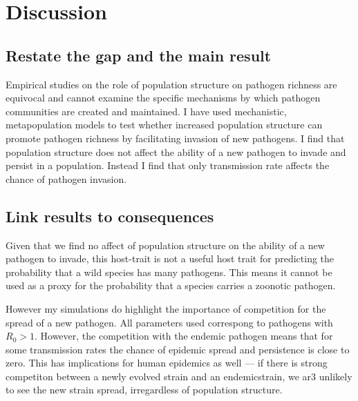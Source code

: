 

\section{Discussion}


\subsection{Restate the gap and the main result}

Empirical studies on the role of population structure on pathogen richness are equivocal and cannot examine the specific mechanisms by which pathogen communities are created and maintained.
I have used mechanistic, metapopulation models to test whether increased population structure can promote pathogen richness by facilitating invasion of new pathogens.
I find that population structure does not affect the ability of a new pathogen to invade and persist in a population.
Instead I find that only transmission rate affects the chance of pathogen invasion.


\subsection{Link results to consequences}

Given that we find no affect of population structure on the ability of a new pathogen to invade, this host-trait is not a useful host trait for predicting the probability that a wild species has many pathogens.
This means it cannot be used as a proxy for the probability that a species carries a zoonotic pathogen.

However my simulations do highlight the importance of competition for the spread of a new pathogen.
All parameters used correspong to pathogens with $R_0>1$.
However, the competition with the endemic pathogen means that for some transmission rates the chance of epidemic spread and persistence is close to zero.
This has implications for human epidemics as well --- if there is strong competiton between a newly evolved strain and an endemicstrain, we ar3 unlikely to see the new strain spread, irregardless of population structure.

